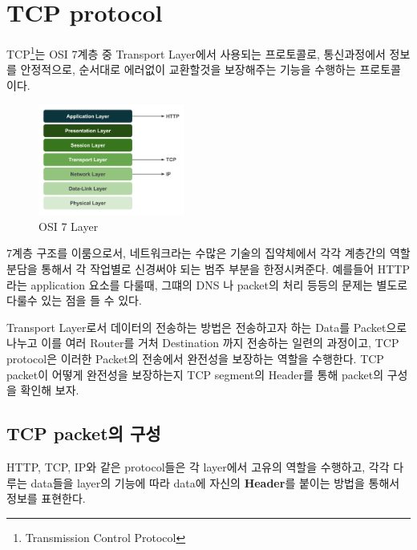 \section{TCP protocol}
TCP\footnote{Transmission Control Protocol}는 OSI 7계층 중 Transport Layer에서 사용되는 프로토콜로, 
통신과정에서 정보를 안정적으로, 순서대로 에러없이 교환할것을 보장해주는 기능을 수행하는 프로토콜이다.\\
\vspace{-4mm}  
\begin{figure} \vspace{-20pt}
\begin{center}
\includegraphics[width=0.43\textwidth]{image/week01/1-0.png}    
\end{center}
\vspace{-20pt}
\caption{\small OSI 7 Layer}
\vspace{-10pt}
\end{figure}
7계층 구조를 이룸으로서, 네트워크라는 수많은 기술의 집약체에서 각각 계층간의 역할 분담을 통해서 각 작업별로 신경써야 되는 범주 부분을 한정시켜준다. 
예를들어 HTTP 라는 application 요소를 다룰때, 그떄의 DNS 나 packet의 처리 등등의 문제는 별도로 다룰수 있는 점을 들 수 있다. 

Transport Layer로서 데이터의 전송하는 방법은 전송하고자 하는 Data를 Packet으로 나누고 이를 여러 Router를 거처 Destination 까지 전송하는 일련의 과정이고, TCP protocol은 이러한 Packet의 전송에서 완전성을 보장하는 역할을 수행한다. 
TCP packet이 어떻게 완전성을 보장하는지 TCP segment의 Header를 통해 packet의 구성을 확인해 보자.
\subsection{TCP packet의 구성}
    HTTP, TCP, IP와 같은 protocol들은 각 layer에서 고유의 역할을 수행하고, 
    각각 다루는 data들을 layer의 기능에 따라 data에 자신의 \textbf{Header}를 붙이는 방법을 통해서 정보를 표현한다. 
    
